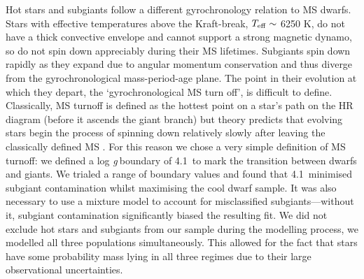 \documentclass[11pt,preprint]{aastex}
\newcommand{\logg}{log \emph{g}}
\newcommand{\subcut}{4.1~}
\begin{document}
Hot stars and subgiants follow a different gyrochronology relation to MS
dwarfs.
Stars with effective temperatures above the Kraft-break, $T_{\rm{eff}}
\sim$ 6250 K, \citep{Kraft1967} do not have a thick convective envelope and
cannot support a strong magnetic dynamo, so do not spin down appreciably
during their MS lifetimes.
Subgiants spin down rapidly as they expand due to angular momentum
conservation and thus diverge from the gyrochronological mass-period-age
plane.
The point in their evolution at which they depart, the `gyrochronological MS
turn off', is difficult to define.
Classically, MS turnoff is defined as the hottest point on a star's path on
the HR diagram (before it ascends the giant branch) but theory predicts that
evolving stars begin the process of spinning down relatively slowly after
leaving the classically defined MS \citep{vanSaders2013}.
For this reason we chose a very simple definition of MS turnoff: we defined
a \logg$~$boundary of \subcut to mark the transition between dwarfs and
giants.
We trialed a range of boundary values and found that \subcut minimised subgiant
contamination whilst maximising the cool dwarf sample.
It was also necessary to use a mixture model to account for misclassified
subgiants---without it, subgiant contamination significantly biased the
resulting fit.
We did not exclude hot stars and subgiants from our sample during the
modelling process, we modelled all three populations simultaneously.
This allowed for the fact that stars have some probability mass lying in all
three regimes due to their large observational uncertainties.
\end{document}
